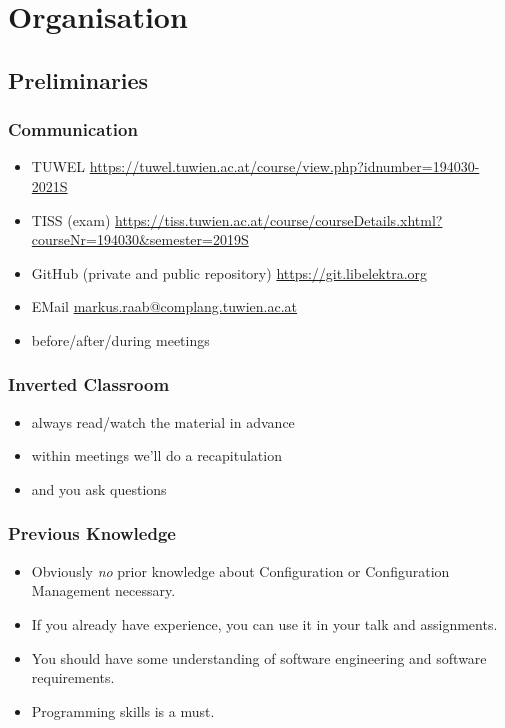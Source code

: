 \section{Organisation}

\subsection{Preliminaries}
\begin{frame}
	\frametitle{Communication}
	\begin{itemize}
		\item TUWEL \url{https://tuwel.tuwien.ac.at/course/view.php?idnumber=194030-2021S}
		\item TISS (exam) \url{https://tiss.tuwien.ac.at/course/courseDetails.xhtml?courseNr=194030&semester=2019S}
		\item GitHub (private and public repository) \url{https://git.libelektra.org}
		\item EMail \url{markus.raab@complang.tuwien.ac.at}
		\item before/after/during meetings
	\end{itemize}
\end{frame}

\begin{frame}
	\frametitle{Inverted Classroom}
	\begin{itemize}
		\item always read/watch the material in advance
		\item within meetings we'll do a recapitulation
		\item and you ask questions
	\end{itemize}
\end{frame}

\begin{frame}
	\frametitle{Previous Knowledge}
	\begin{itemize}
		\item Obviously \textit{no} prior knowledge about Configuration or Configuration Management necessary.
		\item If you already have experience, you can use it in your talk and assignments.
		\item You should have some understanding of software engineering and software requirements.
		\item Programming skills is a must.
	\end{itemize}
\end{frame}

